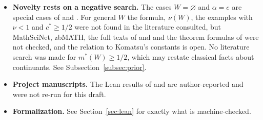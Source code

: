 \documentclass[11pt]{amsart}
\theoremstyle{definition}
\theoremstyle{remark}
\begin{document}
\begin{itemize}
\item \textbf{Novelty rests on a negative search.} The cases $W=\varnothing$ and $\alpha=e$ are special cases of
\cite{P2} and \cite{P2E}. For general $W$ the formula, $\nu(W)$, the examples with $\nu<1$ and $c^*\ge1/2$ were not
found in the literature consulted, but MathSciNet, zbMATH, the full texts of \cite{KL} and \cite{Stewart} and the
theorem formulas of \cite{Komatsu99} were not checked, and the relation to Komatsu's constants is open. No
literature search was made for $m^*(W)\ge1/2$, which may restate classical facts about continuants. See
Subsection~\ref{subsec:prior}.
\item \textbf{Project manuscripts.} The Lean results of \cite{P2} and \cite{P2E} are author-reported and were not
re-run for this draft.
\item \textbf{Formalization.} See Section~\ref{sec:lean} for exactly what is machine-checked.
\end{itemize}

\end{document}
